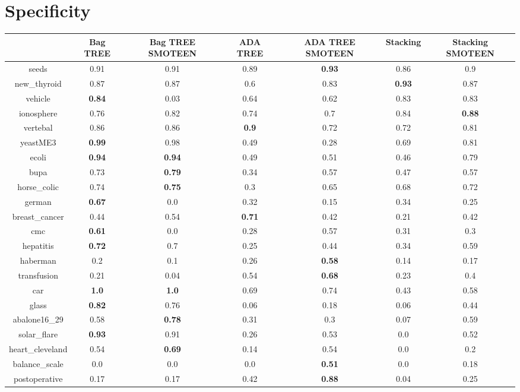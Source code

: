 \documentclass{article}%
\begin{document}
\section*{Specificity}%
\begin{tabular}{c|cccccc}%
&Bag TREE&Bag TREE SMOTEEN&ADA TREE&ADA TREE SMOTEEN&Stacking&Stacking SMOTEEN\\%
\hline%
seeds&0.91&0.91&0.89&\textbf{0.93}&0.86&0.9\\%
new\_thyroid&0.87&0.87&0.6&0.83&\textbf{0.93}&0.87\\%
vehicle&\textbf{0.84}&0.03&0.64&0.62&0.83&0.83\\%
ionosphere&0.76&0.82&0.74&0.7&0.84&\textbf{0.88}\\%
vertebal&0.86&0.86&\textbf{0.9}&0.72&0.72&0.81\\%
yeastME3&\textbf{0.99}&0.98&0.49&0.28&0.69&0.81\\%
ecoli&\textbf{0.94}&\textbf{0.94}&0.49&0.51&0.46&0.79\\%
bupa&0.73&\textbf{0.79}&0.34&0.57&0.47&0.57\\%
horse\_colic&0.74&\textbf{0.75}&0.3&0.65&0.68&0.72\\%
german&\textbf{0.67}&0.0&0.32&0.15&0.34&0.25\\%
breast\_cancer&0.44&0.54&\textbf{0.71}&0.42&0.21&0.42\\%
cmc&\textbf{0.61}&0.0&0.28&0.57&0.31&0.3\\%
hepatitis&\textbf{0.72}&0.7&0.25&0.44&0.34&0.59\\%
haberman&0.2&0.1&0.26&\textbf{0.58}&0.14&0.17\\%
transfusion&0.21&0.04&0.54&\textbf{0.68}&0.23&0.4\\%
car&\textbf{1.0}&\textbf{1.0}&0.69&0.74&0.43&0.58\\%
glass&\textbf{0.82}&0.76&0.06&0.18&0.06&0.44\\%
abalone16\_29&0.58&\textbf{0.78}&0.31&0.3&0.07&0.59\\%
solar\_flare&\textbf{0.93}&0.91&0.26&0.53&0.0&0.52\\%
heart\_cleveland&0.54&\textbf{0.69}&0.14&0.54&0.0&0.2\\%
balance\_scale&0.0&0.0&0.0&\textbf{0.51}&0.0&0.18\\%
postoperative&0.17&0.17&0.42&\textbf{0.88}&0.04&0.25\\%
\end{tabular}

%
\end{document}
